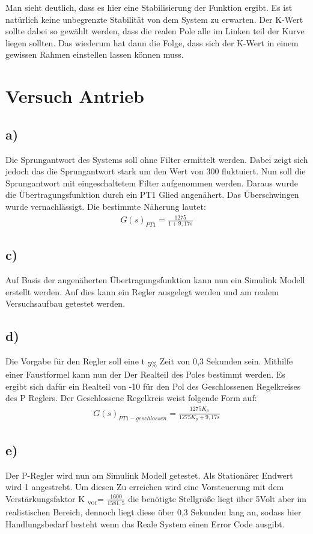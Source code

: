\documentclass[10pt]{scrartcl}
\begin{document}
Man sieht deutlich, dass es hier eine Stabilisierung der Funktion ergibt. Es ist natürlich keine unbegrenzte Stabilität von dem System zu erwarten. Der K-Wert sollte dabei so gewählt werden, dass die realen Pole alle im Linken teil der Kurve liegen sollten. Das wiederum hat dann die Folge, dass sich der K-Wert in einem gewissen Rahmen einstellen lassen können muss.

\section{Versuch Antrieb}
\subsection{a)}	Die Sprungantwort des Systems soll ohne Filter ermittelt werden. Dabei zeigt sich jedoch das die Sprungantwort stark um den Wert von 300 fluktuiert.
	Nun soll die Sprungantwort mit eingeschaltetem Filter aufgenommen werden. Daraus wurde die Übertragungsfunktion durch ein PT1 Glied angenähert. Das Überschwingen wurde vernachlässigt. Die bestimmte Näherung lautet: 
\begin{align}
   G(s)_{PT1}=\frac{1275}{1+9,17s}
\end{align}
\subsection{c)}	Auf Basis der angenäherten Übertragungsfunktion kann nun ein Simulink Modell erstellt werden. Auf dies kann ein Regler ausgelegt werden und am realem Versuchsaufbau getestet werden.
\subsection{d)}	Die Vorgabe für den Regler soll eine t \textsubscript{5\%} Zeit von 0,3 Sekunden sein. Mithilfe einer Faustformel kann nun der Der Realteil des Poles bestimmt werden. Es ergibt sich dafür ein Realteil von -10 für den Pol des Geschlossenen Regelkreises des P Reglers. Der Geschlossene Regelkreis weist folgende Form auf:
\begin{align}
   G(s)_{PT1-geschlossen}=\frac{1275K_p}{1275K_p+9,17s}
\end{align}
\subsection{e)}	Der P-Regler wird nun am Simulink Modell getestet. Als Stationärer Endwert wird 1 angestrebt. Um diesen Zu erreichen wird eine Vorsteuerung mit dem Verstärkungsfaktor K \textsubscript{vor}= $ \frac{1600}{1581,5} $ die benötigte Stellgröße liegt über 5Volt aber im realistischen Bereich, dennoch liegt diese über 0,3 Sekunden lang an, sodass hier Handlungsbedarf besteht wenn das Reale System einen Error Code ausgibt.
\end{document}
